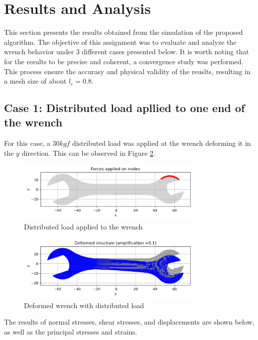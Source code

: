 \section{Results and Analysis}

This section presents the results obtained from the simulation of the proposed algorithm. The objective of this assignment was to evaluate and analyze the wrench behavior under 3 different cases presented below. It is worth noting that for the results to be precise and coherent, a convergence study was performed. This process ensure the accurasy and physical validity of the reuslts, resulting in a mesh size of about $l_c=0.8$.

\subsection{Case 1: Distributed load apllied to one end of the wrench}

For this case, a $30 kgf$ distributed load was applied at the wrench deforming it in the $y$ direction. This can be observed in Figure \ref{fig:stress}.

\begin{figure}[H]
    \centering
    \includegraphics[width=0.8\textwidth]{GRAFICOS/Case b_fuerzas.png}
    \caption{Distributed load applied to the wrench}
    \label{fig:xd}
\end{figure}

\begin{figure}[H]
    \centering
    \includegraphics[width=0.8\textwidth]{GRAFICOS/Case b_deformada.png}
    \caption{Deformed wrench with distributed load}
    \label{fig:stress}
\end{figure}

The results of normal stresses, shear stresses, and displacements are shown below, as well as the principal stresses and strains.


